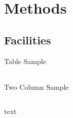 
% 
%
\section{Methods}

\subsection*{Facilities}

\begin{frame}{Table Sample}
\begin{table}[h]
\begin{tabular}{c | c c c}
\end{tabular}
\end{table}
\end{frame}

\begin{frame}{Two Column Sample}
\begin{columns}[onlytextwidth]
\begin{column}{0.45\textwidth}
	text
\end{column}
\begin{column}{0.45\textwidth}
	\begin{figure}
	
	\end{figure}
\end{column}
\end{columns}
\end{frame}


